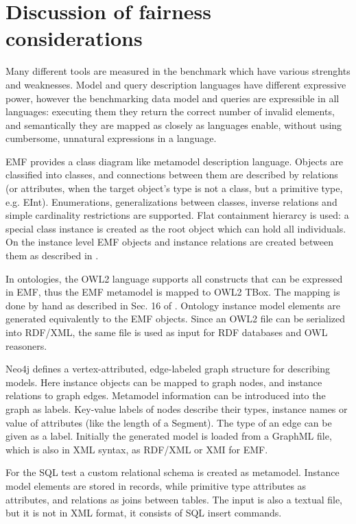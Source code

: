 \section{Discussion of fairness considerations}
Many different tools are measured in the benchmark which have various strenghts
and weaknesses. Model and query description languages have different expressive
power, however the benchmarking data model and queries are expressible in all
languages: executing them they return the correct number of invalid elements,
and semantically they are mapped as closely as languages enable, without using
cumbersome, unnatural expressions in a language.

EMF provides a class diagram like metamodel description language. Objects are
classified into classes, and connections between them are described by relations
(or attributes, when the target object's type is not a class, but a primitive
type, e.g. EInt). Enumerations, generalizations between classes, inverse
relations and simple cardinality restrictions are supported. Flat containment
hierarcy is used: a special class instance is created as the root object which can
hold all individuals. On the instance level EMF objects and instance relations
are created between them as described in .

In ontologies, the OWL2 language supports all constructs that can be expressed in
EMF, thus the EMF metamodel is mapped to OWL2 TBox. The mapping is done by hand as
described in Sec. 16 of \cite{OMG2009ODM}. Ontology instance model elements are
generated equivalently to the EMF objects. Since an OWL2 file can be serialized
into RDF/XML, the same file is used as input for RDF databases and OWL
reasoners.

Neo4j defines a vertex-attributed, edge-labeled graph structure for describing
models. Here instance objects can be mapped to graph nodes, and instance
relations to graph edges. Metamodel information can be introduced into the graph
as labels. Key-value labels of nodes describe their types, instance names or
value of attributes (like the length of a Segment). The type of an edge can be
given as a label. Initially the generated model is loaded from a GraphML file,
which is also in XML syntax, as RDF/XML or XMI for EMF.

For the SQL test a custom relational schema is created as metamodel. Instance
model elements are stored in records, while primitive type attributes as
attributes, and relations as joins between tables. The input is also a textual
file, but it is not in XML format, it consists of SQL insert commands.

